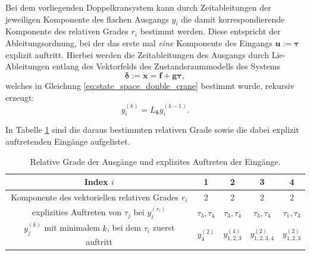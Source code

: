 Bei dem vorliegenden Doppelkransystem kann durch Zeitableitungen der jeweiligen Komponente des flachen Ausgangs $y_i$ die damit korrespondierende Komponente des relativen Grades $r_i$ bestimmt werden. Diese entspricht der Ableitungsordnung, bei der das erste mal \textit{eine} Komponente des Eingangs $\mathbf{u}:=\boldsymbol{\tau}$ explizit auftritt. Hierbei werden die Zeitableitungen des Ausgangs durch Lie-Ableitungen entlang des Vektorfelds des Zustandsraummodells des Systems 
\begin{equation}
	\label{eq:state_space_vf}
	\boldsymbol{\delta} := \dot{\mathbf{x}} = \mathbf{f} + \mathbf{g} \boldsymbol{\tau},
\end{equation}
welches in Gleichung \eqref{eq:state_space_double_crane} bestimmt wurde, rekursiv erzeugt: 
\begin{equation}
	\label{eq:Lie_time_deriv}
	y_i^{(k)} = L_{\boldsymbol{\delta}} y_i^{(k-1)} .
\end{equation}

In Tabelle \ref{tab:relative_degrees} sind die daraus bestimmten relativen Grade sowie die dabei explizit auftretenden Eingänge aufgelistet.
\begin{table}[htbp]%
	\centering
	\caption{Relative Grade der Ausgänge und explizites Auftreten der Eingänge.}
	\label{tab:relative_degrees}
	\begin{tabular}{c| c c c c} 
		\toprule
		Index $i$ & 1 & 2 & 3 & 4 \\ 
		\hline
		Komponente des vektoriellen relativen Grades $r_i$ & 2 & 2 & 2 & 2\\ 
		\hline
		explizities Auftreten von $\tau_j$ bei $y_i^{(r_i)}$ & $\tau_3, \tau_4$ & $\tau_3, \tau_4$ & $\tau_3, \tau_4$ & $\tau_1, \tau_3$ \\
		\hline
		$y_j^{(k)}$ mit minimalem $k$, bei dem $\tau_i$ zuerst auftritt & $y_4^{(2)}$ & $y_{1,2,3}^{(4)}$ & $y_{1,2,3,4}^{(2)}$ & $y_{1,2,3}^{(2)}$\\
		\bottomrule
	\end{tabular}
\end{table}

